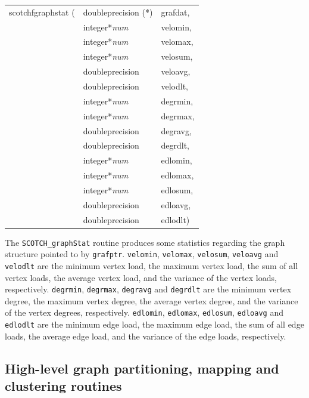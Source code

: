 \begin{itemize}
{\tt\begin{tabular}{l@{}ll}
scotchfgraphstat ( & doubleprecision (*) & grafdat, \\
                   & integer*{\it num}   & velomin, \\
                   & integer*{\it num}   & velomax, \\
                   & integer*{\it num}   & velosum, \\
                   & doubleprecision     & veloavg, \\
                   & doubleprecision     & velodlt, \\
                   & integer*{\it num}   & degrmin, \\
                   & integer*{\it num}   & degrmax, \\
                   & doubleprecision     & degravg, \\
                   & doubleprecision     & degrdlt, \\
                   & integer*{\it num}   & edlomin, \\
                   & integer*{\it num}   & edlomax, \\
                   & integer*{\it num}   & edlosum, \\
                   & doubleprecision     & edloavg, \\
                   & doubleprecision     & edlodlt)
\end{tabular}}

\progdes

The {\tt SCOTCH\_graphStat} routine produces some statistics regarding
the graph structure pointed to by {\tt grafptr}.
{\tt velomin}, {\tt velomax}, {\tt velosum}, {\tt veloavg} and
{\tt velodlt} are the minimum vertex load, the maximum vertex
load, the sum of all vertex loads, the average vertex load,
and the variance of the vertex loads, respectively.
{\tt degrmin}, {\tt degrmax}, {\tt degravg} and
{\tt degrdlt} are the minimum vertex degree, the maximum vertex
degree, the average vertex degree, and the variance of the vertex
degrees, respectively.
{\tt edlomin}, {\tt edlomax}, {\tt edlosum}, {\tt edloavg} and
{\tt edlodlt} are the minimum edge load, the maximum edge
load, the sum of all edge loads, the average edge load,
and the variance of the edge loads, respectively.
\end{itemize}

\subsection{High-level graph partitioning, mapping and clustering routines}
\label{sec-lib-func-part-map}

